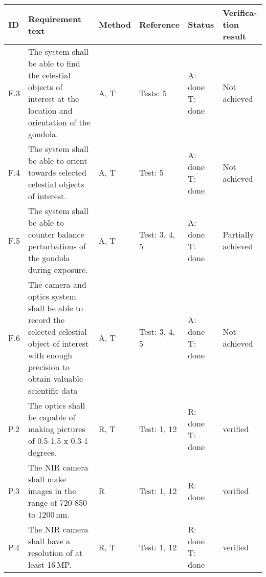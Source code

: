 
\makeatletter
\renewcommand\@makefntext[1]{\leftskip=3em\hskip-1em\@makefnmark#1}
\makeatother

\begin{longtable}[]{|m{}| m{}|m{}|m{}|m{}|m{}|}

\hline
\textbf{ID} & \textbf{Requirement text} & \textbf{Method} & \textbf{Reference} & \textbf{Status} & \textbf{Verifica-tion result} \\\hline

 F.3 & The system shall be able to find the celestial objects of interest at the location and orientation of the gondola.
& A, T & Tests: 5 & A: done \newline T: done & Not achieved\\\hline

  F.4 & The system shall be able to orient towards selected celestial objects of interest.
& A, T & Test: 5 & A: done \newline T: done & Not achieved \\\hline

  F.5 & The system shall be able to counter balance perturbations of the gondola during exposure.
& A, T & Test: 3, 4, 5 & A: done \newline T: done & Partially achieved \\\hline

  F.6 & The camera and optics system shall be able to record the selected celestial object of interest with enough precision to obtain valuable scientific data
& A, T & Test: 3, 4, 5 & A: done \newline T: done & Not achieved \\\hline




P.2 & The optics shall be capable of making pictures of 0.5-1.5 x 0.3-1\,degrees.
& R, T & Test: 1, 12 & R: done \newline T: done  &  verified \\\hline

P.3 & The NIR camera shall make images in the range of 720-850 to 1200\,nm.
& R & Test: 1, 12 & R: done  &  verified \\\hline

P.4 & The NIR camera shall have a resolution of at least 16\,MP.
& R, T& Test: 1, 12 & R: done \newline T: done &  verified \\\hline


\end{longtable}
